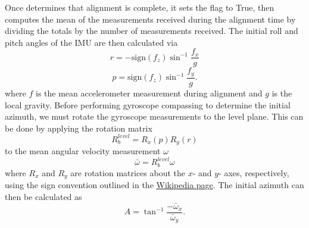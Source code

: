 \documentclass[11pt, oneside]{article}   	%
\begin{document}
Once  determines that alignment is complete, it sets the  flag to True, then computes the mean of the measurements received during the alignment time by dividing the totals by the number of measurements received.  The initial roll and pitch angles of the IMU are then calculated via
\begin{equation}
r=-\textrm{sign}(f_z)\sin^{-1}\frac{f_x}{g}
\end{equation}
\begin{equation}
p=\textrm{sign}(f_z)\sin^{-1}\frac{f_y}{g}.
\end{equation}
where $f$ is the mean accelerometer measurement during alignment and $g$ is the local gravity.  Before performing gyroscope compassing to determine the initial azimuth, we must rotate the gyroscope measurements to the level plane.  This can be done by applying the rotation matrix
\begin{equation}
R_b^{level}=R_x(p)R_y(r)
\end{equation}
to the mean angular velocity measurement $\omega$
\begin{equation}
\bar \omega=R_b^{level}\omega
\end{equation}
where $R_x$ and $R_y$ are rotation matrices about the $x$- and $y$- axes, respectively, using the sign convention outlined in the \href{https://en.wikipedia.org/wiki/Rotation_matrix}{Wikipedia page}. 
The initial azimuth can then be calculated as 
\begin{equation}
A=\tan^{-1}\frac{-\bar\omega_x}{\bar\omega_y}.
\end{equation}
\end{document}
